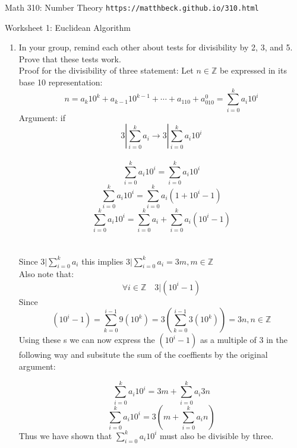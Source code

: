 \documentclass[11pt]{article}
\def\Z{\mathbb{Z}}
\begin{document}
\setlength{\parindent}{0pt}
\setlength{\parskip}{0.2cm}

$\mbox{}$
\vspace{-1in}

{ Math 310: Number Theory}
\hfill
{\tt https://matthbeck.github.io/310.html}

\vspace{.3in}




\begin{center}
\Large{Worksheet 1: Euclidean Algorithm}
\end{center}

\begin{enumerate}

\item In your group, remind each other about tests for divisibility by 2, 3, and 5.
Prove that these tests work.\\

  Proof for the divisibility of three statement:
  Let $n \in \Z$ be expressed in its base 10 representation:
  \[
    n=a_k10^k+a_{k-1}10^{k-1}+\cdots+a_110+a_010^0=\sum_{i=0}^ka_i10^i
  \]
  Argument: if $$3| \sum_{i=0}^ka_i \rightarrow  3|\sum_{i=0}^ka_i10^i$$\\
  \[
    \sum_{i=0}^ka_i10^i=\sum_{i=0}^ka_i10^i
  \]
  \[
    \sum_{i=0}^ka_i10^i=\sum_{i=0}^ka_i(1+10^i-1)
  \]
  \[
    \sum_{i=0}^ka_i10^i=\sum_{i=0}^ka_i+\sum_{i=0}^ka_i(10^i-1)
  \]\\\\
Since $3| \sum_{i=0}^ka_i$ this implies $3| \sum_{i=0}^ka_i=3m,m\in \Z$\\
Also note that: \[
  \forall i\in \Z \quad 3|(10^i-1)
\]
Since \[
  (10^i-1)=\sum_{k=0}^{i-1}9(10^k)=3(\sum_{k=0}^{i-1}3(10^k))=3n,n \in \Z
\]
Using these s we can now express the $(10^i-1)$ as a multiple of 3 in the following way and subsitute the sum of the coeffients by the original argument:

\[
  \sum_{i=0}^ka_i10^i=3m+\sum_{i=0}^ka_i3n
\]
\[
    \sum_{i=0}^ka_i10^i=3(m+\sum_{i=0}^ka_in)
\]
Thus we have shown that $\sum_{i=0}^ka_i10^i$ must also be divisible by three.


\end{enumerate}
\end{document}
